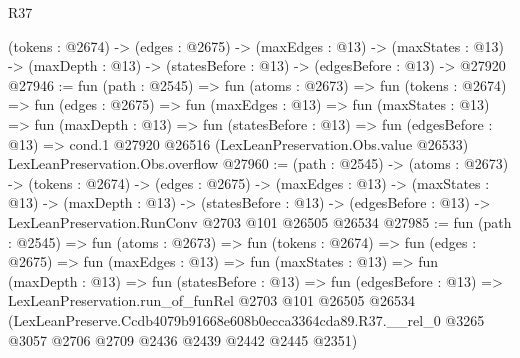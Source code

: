 \begin{lexlean}{R37}
\begin{coremodule}
  (tokens : @2674) ->
  (edges : @2675) ->
  (maxEdges : @13) ->
  (maxStates : @13) -> (maxDepth : @13) -> (statesBefore : @13) -> (edgesBefore : @13) -> @27920
@27946 := fun (path : @2545) =>
  fun (atoms : @2673) =>
  fun (tokens : @2674) =>
  fun (edges : @2675) =>
  fun (maxEdges : @13) =>
  fun (maxStates : @13) =>
  fun (maxDepth : @13) =>
  fun (statesBefore : @13) =>
  fun (edgesBefore : @13) =>
  cond.{1} @27920 @26516 (LexLeanPreservation.Obs.value @26533) LexLeanPreservation.Obs.overflow
@27960 := (path : @2545) ->
  (atoms : @2673) ->
  (tokens : @2674) ->
  (edges : @2675) ->
  (maxEdges : @13) ->
  (maxStates : @13) ->
  (maxDepth : @13) ->
  (statesBefore : @13) ->
  (edgesBefore : @13) -> LexLeanPreservation.RunConv @2703 @101 @26505 @26534
@27985 := fun (path : @2545) =>
  fun (atoms : @2673) =>
  fun (tokens : @2674) =>
  fun (edges : @2675) =>
  fun (maxEdges : @13) =>
  fun (maxStates : @13) =>
  fun (maxDepth : @13) =>
  fun (statesBefore : @13) =>
  fun (edgesBefore : @13) =>
  LexLeanPreservation.run_of_funRel
    @2703
    @101
    @26505
    @26534
    (LexLeanPreserve.Ccdb4079b91668e608b0ecca3364cda89.R37.__rel_0
      @3265
      @3057
      @2706
      @2709
      @2436
      @2439
      @2442
      @2445
      @2351)
\end{coremodule}
\end{lexlean}
